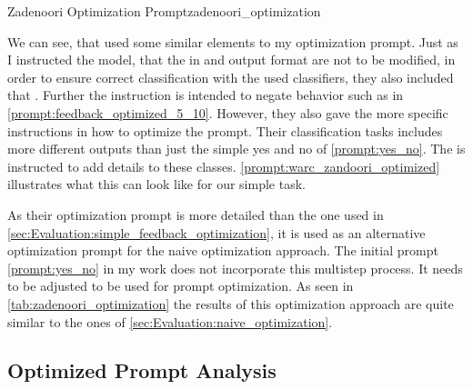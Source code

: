 \begin{prompt}{Zadenoori Optimization Prompt}{zadenoori_optimization}
    \\
    
\end{prompt}

We can see, that \citeauthor{zadenoori2025AutomaticPrompt} used some similar elements to my optimization prompt.
Just as I instructed the model, that the in and output format are not to be modified, in order to ensure correct classification with the used classifiers, they also included that .
Further the instruction  is intended to negate behavior such as in \autoref{prompt:feedback_optimized_5_10}.
However, they also gave the \LLM more specific instructions in how to optimize the prompt.
Their classification tasks includes more different outputs than just the simple yes and no of \autoref{prompt:yes_no}.
The \LLM is instructed to add details to these classes.
\autoref{prompt:warc_zandoori_optimized} illustrates what this can look like for our simple \TLR \RtR task.

As their optimization prompt is more detailed than the one used in \autoref{sec:Evaluation:simple_feedback_optimization}, it is used as an alternative optimization prompt for the naive optimization approach.
The initial prompt \autoref{prompt:yes_no} in my work does not incorporate this multistep process.
It needs to be adjusted to be used for \RtR prompt optimization.
As seen in \autoref{tab:zadenoori_optimization} the results of this optimization approach are quite similar to the ones of \autoref{sec:Evaluation:naive_optimization}.

\subsection{Optimized Prompt Analysis}
\label{subsec:Evaluation:varying-the-optimization-prompt:optimized-prompt-analysis}

